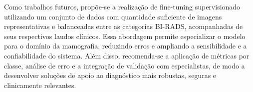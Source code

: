 \documentclass[10pt,conference]{IEEEtran}
\begin{document}
Como trabalhos futuros, propõe-se a realização de fine-tuning supervisionado utilizando um conjunto de dados com quantidade suficiente de imagens representativas e balanceadas entre as categorias BI-RADS, acompanhadas de seus respectivos laudos clínicos. Essa abordagem permite especializar o modelo para o domínio da mamografia, reduzindo erros e ampliando a sensibilidade e a confiabilidade do sistema. Além disso, recomenda-se a aplicação de métricas por classe, análise de erro e a integração de validação com especialistas, de modo a desenvolver soluções de apoio ao diagnóstico mais robustas, seguras e clinicamente relevantes. 





\end{document}
